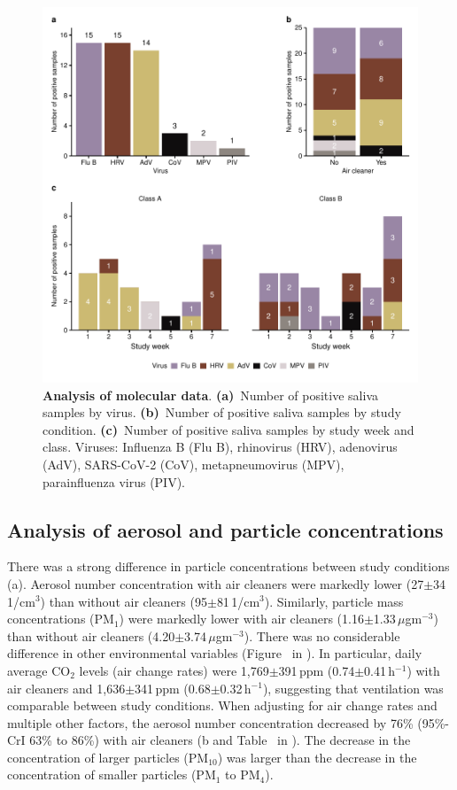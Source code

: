 \documentclass[fleqn,11pt]{wlscirep}
\begin{document}
\begin{figure}[!htpb]
    \centering
    \includegraphics{../../results/mol-data/descriptives.pdf}
    \caption{\textbf{Analysis of molecular data}. \textbf{(a)}~Number of positive saliva samples by virus. \textbf{(b)}~Number of positive saliva samples by study condition. \textbf{(c)}~Number of positive saliva samples by study week and class. Viruses: Influenza B (Flu B), rhinovirus (HRV), adenovirus (AdV), SARS-CoV-2 (CoV), metapneumovirus (MPV), parainfluenza virus (PIV).}
    \label{fig:molecular-descriptives}
\end{figure}

\subsection{Analysis of aerosol and particle concentrations}

There was a strong difference in particle concentrations between study conditions (a). Aerosol number concentration with air cleaners were markedly lower (27$\pm$34\,1/cm$^3$) than without air cleaners (95$\pm$81\,1/cm$^3$). Similarly, particle mass concentrations (\eg PM$_1$) were markedly lower with air cleaners (1.16$\pm$1.33\,$\mu$gm$^{-3}$) than without air cleaners (4.20$\pm$3.74\,$\mu$gm$^{-3}$). There was no considerable difference in other environmental variables (Figure~ in \supp). In particular, daily average CO$_2$ levels (air change rates) were 1,769$\pm$391\,ppm (0.74$\pm$0.41\,h$^{-1}$) with air cleaners and 1,636$\pm$341\,ppm (0.68$\pm$0.32\,h$^{-1}$), suggesting that ventilation was comparable between study conditions. When adjusting for air change rates and multiple other factors, the aerosol number concentration decreased by 76\% (95\%-CrI 63\% to 86\%) with air cleaners (b and Table~ in \supp). The decrease in the concentration of larger particles (PM$_{10}$) was larger than the decrease in the concentration of smaller particles (PM$_1$ to PM$_{4}$). 
\end{document}
